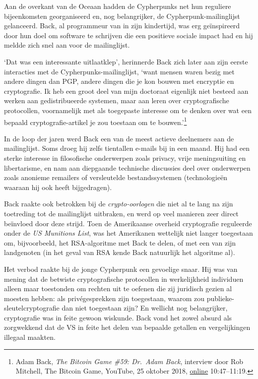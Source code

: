 \documentclass[
  a5paper,
  smalldemyvopaper,11pt,twoside,onecolumn,openright,extrafontsizes,
hidelinks]{memoir}
\begin{document}
Aan de overkant van de Oceaan hadden de Cypherpunks net hun reguliere
bijeenkomsten georganiseerd en, nog belangrijker, de
Cypherpunk-mailinglijst gelanceerd. Back, al programmeur van in zijn
kindertijd, was erg geïnspireerd door hun doel om software te schrijven
die een positieve sociale impact had en hij meldde zich snel aan voor de
mailinglijst.

`Dat was een interessante uitlaatklep', herinnerde Back zich later aan
zijn eerste interacties met de Cypherpunks-mailinglijst, `want mensen
waren bezig met andere dingen dan PGP, andere dingen die je kon bouwen
met encryptie en cryptografie. Ik heb een groot deel van mijn doctoraat
eigenlijk niet besteed aan werken aan gedistribueerde systemen, maar aan
leren over cryptografische protocollen, voornamelijk met als toegepaste
interesse om te denken over wat een bepaald cryptografie-artikel je zou
toestaan om te bouwen.'\footnote{Adam Back, \emph{The Bitcoin Game \#59:
  Dr.~Adam Back}, interview door Rob Mitchell, The Bitcoin Game,
  YouTube, 25 oktober 2018,
  \href{https://www.youtube.com/watch?v=xxYsRjanphA&t=647s}{online}
  10:47--11:19.}

In de loop der jaren werd Back een van de meest actieve deelnemers aan
de mailinglijst. Soms droeg hij zelfs tientallen e-mails bij in een
maand. Hij had een sterke interesse in filosofische onderwerpen zoals
privacy, vrije meningsuiting en libertarisme, en nam aan diepgaande
technische discussies deel over onderwerpen zoals anonieme remailers of
versleutelde bestandssystemen (technologieën waaraan hij ook heeft
bijgedragen).

Back raakte ook betrokken bij de \emph{crypto-oorlogen} die niet al te
lang na zijn toetreding tot de mailinglijst uitbraken, en werd op veel
manieren zeer direct beïnvloed door deze strijd. Toen de Amerikaanse
overheid cryptografie reguleerde onder de \emph{US Munitions List}, was
het Amerikanen wettelijk niet langer toegestaan om, bijvoorbeeld, het
RSA-algoritme met Back te delen, of met een van zijn landgenoten (in het
geval van RSA kende Back natuurlijk het algoritme al).

Het verbod raakte bij de jonge Cypherpunk een gevoelige snaar. Hij was
van mening dat de betwiste cryptografische protocollen in werkelijkheid
individuen alleen maar toestonden om rechten uit te oefenen die zij
juridisch gezien al moesten hebben: als privégesprekken zijn toegestaan,
waarom zou publieke-sleutelcryptografie dan niet toegestaan zijn? En
wellicht nog belangrijker, cryptografie was in feite gewoon wiskunde.
Back vond het zowel absurd als zorgwekkend dat de VS in feite het delen
van bepaalde getallen en vergelijkingen illegaal maakten.
\end{document}
